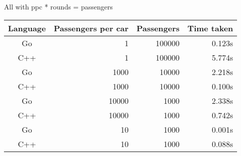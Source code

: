 \documentclass[11pt]{article}
\begin{document}
All with ppc * rounds = passengers

\begin{tabular}{c r r r}
Language    & Passengers per car & Passengers & Time taken \\
\toprule
Go 			& 1 & 100000 & 0.123s \\
C++         & 1 & 100000 & 5.774s \\
\cmidrule{1-4}
Go 			& 1000 & 10000 & 2.218s \\
C++         & 1000 & 10000 & 0.100s \\
\cmidrule{1-4}
Go 			& 10000 & 1000 & 2.338s \\
C++         & 10000 & 1000 & 0.742s \\
\cmidrule{1-4}
Go 			& 10 & 1000 & 0.001s \\
C++         & 10 & 1000 & 0.088s \\
\end{tabular}
\end{document}
